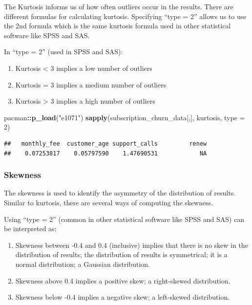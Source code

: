 \documentclass[
]{article}
\newenvironment{Shaded}{\begin{snugshade}}{\end{snugshade}}
\newcommand{\AttributeTok}[1]{\textcolor[rgb]{0.13,0.29,0.53}{#1}}
\newcommand{\DecValTok}[1]{\textcolor[rgb]{0.00,0.00,0.81}{#1}}
\newcommand{\FunctionTok}[1]{\textcolor[rgb]{0.13,0.29,0.53}{\textbf{#1}}}
\newcommand{\NormalTok}[1]{#1}
\newcommand{\SpecialCharTok}[1]{\textcolor[rgb]{0.81,0.36,0.00}{\textbf{#1}}}
\newcommand{\StringTok}[1]{\textcolor[rgb]{0.31,0.60,0.02}{#1}}
\begin{document}
The Kurtosis informs us of how often outliers occur in the results.
There are different formulas for calculating kurtosis. Specifying ``type
= 2'' allows us to use the 2nd formula which is the same kurtosis
formula used in other statistical software like SPSS and SAS.

In ``type = 2'' (used in SPSS and SAS):

\begin{enumerate}
\def\labelenumi{\arabic{enumi}.}
\item
  Kurtosis \textless{} 3 implies a low number of outliers
\item
  Kurtosis = 3 implies a medium number of outliers
\item
  Kurtosis \textgreater{} 3 implies a high number of outliers
\end{enumerate}

\begin{Shaded}
\begin{Highlighting}[]
\NormalTok{pacman}\SpecialCharTok{::}\FunctionTok{p\_load}\NormalTok{(}\StringTok{"e1071"}\NormalTok{)}
\FunctionTok{sapply}\NormalTok{(subscription\_churn\_data[,],  kurtosis, }\AttributeTok{type =} \DecValTok{2}\NormalTok{)}
\end{Highlighting}
\end{Shaded}

\begin{verbatim}
##   monthly_fee  customer_age support_calls         renew 
##    0.07253817    0.05797590    1.47690531            NA
\end{verbatim}

\subsubsection{Skewness}\label{skewness}

The skewness is used to identify the asymmetry of the distribution of
results. Similar to kurtosis, there are several ways of computing the
skewness.

Using ``type = 2'' (common in other statistical software like SPSS and
SAS) can be interpreted as:

\begin{enumerate}
\def\labelenumi{\arabic{enumi}.}
\item
  Skewness between -0.4 and 0.4 (inclusive) implies that there is no
  skew in the distribution of results; the distribution of results is
  symmetrical; it is a normal distribution; a Gaussian distribution.
\item
  Skewness above 0.4 implies a positive skew; a right-skewed
  distribution.
\item
  Skewness below -0.4 implies a negative skew; a left-skewed
  distribution.
\end{enumerate}
\end{document}
